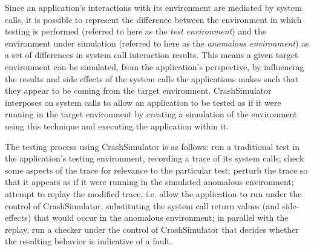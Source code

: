 

Since an application's interactions with its environment are mediated
by system calls, it is possible to represent the difference between
the environment in which testing is performed (referred to here as the
{\em test environment}) and the environment under simulation (referred
to here as the {\em anomalous environment}) as a set of differences in
system call interaction results. This means a given target
environment can be simulated, from the application's perspective, by
influencing the results and side effects of the system calls the
applications makes such that they appear to be coming from the target
environment.  CrashSimulator interposes on system calls to allow an
application to be tested as if it were running in the target
environment by creating a simulation of the environment using this
technique and executing the application within it.

The testing process using CrashSimulator is as follows: run a
traditional test in the application's testing environment, recording a
trace of its system calls; check some aspects of the trace for
relevance to the particular test; perturb the trace so that it appears
as if it were running in the simulated anomalous environment;
attempt to replay the modified trace, i.e. allow the application to
run under the control of CrashSimulator, substituting the system call
return values (and side-effects) that would occur in the anomalous
environment; in parallel with the replay, run a checker under the
control of CrashSimulator that decides whether the resulting behavior
is indicative of a fault.

